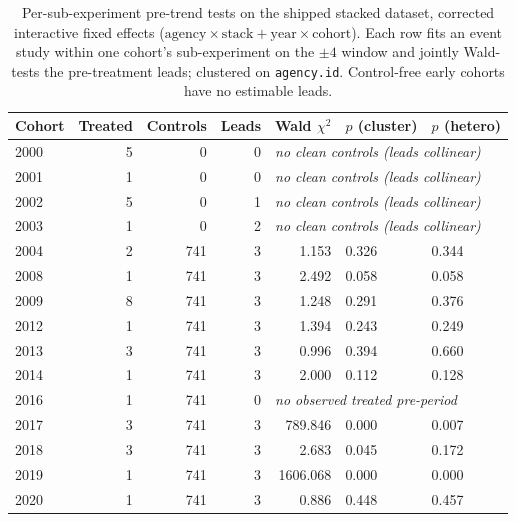\begin{table}[t]\centering
\caption{Per-sub-experiment pre-trend tests on the shipped stacked dataset, corrected interactive fixed effects ($\text{agency}\times\text{stack}+\text{year}\times\text{cohort}$). Each row fits an event study within one cohort's sub-experiment on the $\pm4$ window and jointly Wald-tests the pre-treatment leads; clustered on \texttt{agency.id}. Control-free early cohorts have no estimable leads.}
\label{tab:pretrend-shipped}
\begin{tabular}{lrrrrll}
\toprule
Cohort & Treated & Controls & Leads & Wald $\chi^2$ & $p$ (cluster) & $p$ (hetero) \\
\midrule
2000 & 5 & 0 & 0 & \multicolumn{3}{l}{\textit{no clean controls (leads collinear)}} \\
2001 & 1 & 0 & 0 & \multicolumn{3}{l}{\textit{no clean controls (leads collinear)}} \\
2002 & 5 & 0 & 1 & \multicolumn{3}{l}{\textit{no clean controls (leads collinear)}} \\
2003 & 1 & 0 & 2 & \multicolumn{3}{l}{\textit{no clean controls (leads collinear)}} \\
2004 & 2 & 741 & 3 & 1.153 & 0.326 & 0.344 \\
2008 & 1 & 741 & 3 & 2.492 & 0.058 & 0.058 \\
2009 & 8 & 741 & 3 & 1.248 & 0.291 & 0.376 \\
2012 & 1 & 741 & 3 & 1.394 & 0.243 & 0.249 \\
2013 & 3 & 741 & 3 & 0.996 & 0.394 & 0.660 \\
2014 & 1 & 741 & 3 & 2.000 & 0.112 & 0.128 \\
2016 & 1 & 741 & 0 & \multicolumn{3}{l}{\textit{no observed treated pre-period}} \\
2017 & 3 & 741 & 3 & 789.846 & 0.000 & 0.007 \\
2018 & 3 & 741 & 3 & 2.683 & 0.045 & 0.172 \\
2019 & 1 & 741 & 3 & 1606.068 & 0.000 & 0.000 \\
2020 & 1 & 741 & 3 & 0.886 & 0.448 & 0.457 \\
\bottomrule
\end{tabular}
\end{table}

